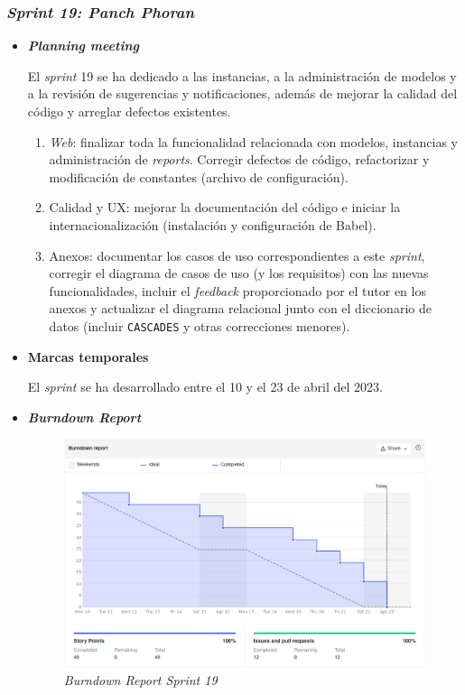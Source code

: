 \subsubsection{\textit{Sprint 19: Panch Phoran}}
\begin{itemize}
	\item \textbf{\textit{Planning meeting}}
	
	El \textit{sprint} 19 se ha dedicado a las instancias, a la administración de modelos y a la revisión de sugerencias y notificaciones, además de mejorar la calidad del código y arreglar defectos existentes.
	
	\begin{enumerate}
		\item \textit{Web}: finalizar toda la funcionalidad relacionada con modelos, instancias y administración de \textit{reports}. Corregir defectos de código, refactorizar y modificación de constantes (archivo de configuración).
		\item Calidad y UX: mejorar la documentación del código e iniciar la internacionalización (instalación y configuración de Babel).
		\item Anexos: documentar los casos de uso correspondientes a este \textit{sprint}, corregir el diagrama de casos de uso (y los requisitos) con las nuevas funcionalidades, incluir el \textit{feedback} proporcionado por el tutor en los anexos y actualizar el diagrama relacional junto con el diccionario de datos (incluir \texttt{CASCADES} y otras correcciones menores).
		
	\end{enumerate}
	\item \textbf{Marcas temporales}		
	
	El \textit{sprint} se ha desarrollado entre el 10 y el 23 de abril del 2023.
	
	\item \textbf{\textit{Burndown Report}}
	
	\begin{figure}[h]
		\caption{\textit{Burndown Report Sprint 19}}
		\centering
		\includegraphics[width=\textwidth]{../img/anexos/bdr/s19_bdr}
	\end{figure}
	

\end{itemize}
